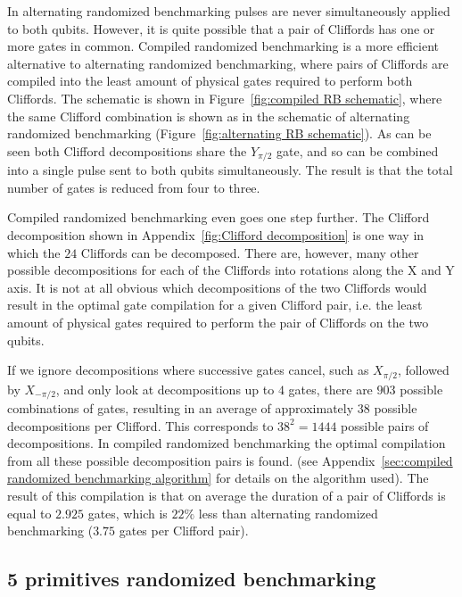         In alternating randomized benchmarking pulses are never simultaneously applied to both qubits. However, it is quite possible that a pair of Cliffords has one or more gates in common. Compiled randomized benchmarking is a more efficient alternative to alternating randomized benchmarking, where pairs of Cliffords are compiled into the least amount of physical gates required to perform both Cliffords. The schematic is shown in Figure~\ref{fig:compiled RB schematic}, where the same Clifford combination is shown as in the schematic of alternating randomized benchmarking (Figure~\ref{fig:alternating RB schematic}). As can be seen both Clifford decompositions share the $Y_{\pi/2}$ gate, and so can be combined into a single pulse sent to both qubits simultaneously. The result is that the total number of gates is reduced from four to three.

        Compiled randomized benchmarking even goes one step further. The Clifford decomposition shown in Appendix~\ref{fig:Clifford decomposition} is one way in which the $24$ Cliffords can be decomposed. There are, however, many other possible decompositions for each of the Cliffords into rotations along the X and Y axis. It is not at all obvious which decompositions of the two Cliffords would result in the optimal gate compilation for a given Clifford pair, i.e. the least amount of physical gates required to perform the pair of Cliffords on the two qubits.

        If we ignore decompositions where successive gates cancel, such as $X_{\pi/2}$, followed by $X_{-\pi/2}$, and only look at decompositions up to $4$ gates, there are $903$ possible combinations of gates, resulting in an average of approximately $38$ possible decompositions per Clifford. This corresponds to $38^2=1444$ possible pairs of decompositions. In compiled randomized benchmarking the optimal compilation from all these possible decomposition pairs is found. (see Appendix~\ref{sec:compiled randomized benchmarking algorithm} for details on the algorithm used). The result of this compilation is that on average the duration of a pair of Cliffords is equal to $2.925$ gates, which is $22\%$ less than alternating randomized benchmarking ($3.75$ gates per Clifford pair).

      \subsection{5 primitives randomized benchmarking}
        \label{ssec:5 primitives randomized benchmarking}

